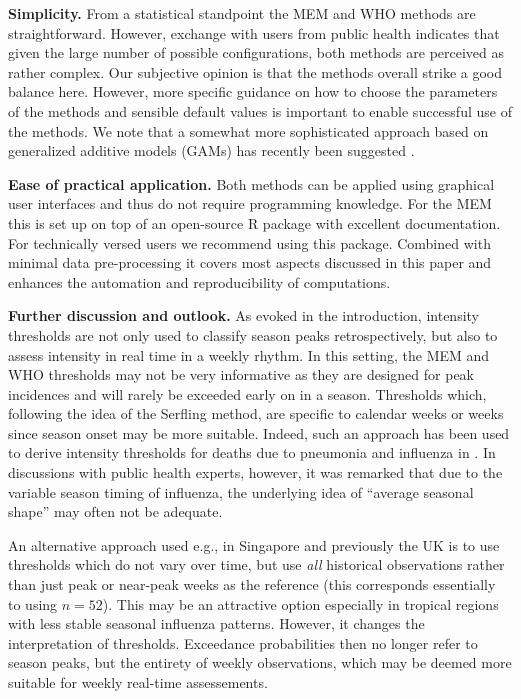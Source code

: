 \documentclass[12pt]{article}
\begin{document}
\begin{description}
\item \textbf{Simplicity.} From a statistical standpoint the MEM and WHO methods are straightforward. However, exchange with users from public health indicates that given the large number of possible configurations, both methods are perceived as rather complex. Our subjective opinion is that the methods overall strike a good balance here. However, more specific guidance on how to choose the parameters of the methods and sensible default values is important to enable successful use of the methods. We note that a somewhat more sophisticated approach based on generalized additive models (GAMs) has recently been suggested \citep{Pang2023}.
\item \textbf{Ease of practical application.} Both methods can be applied using graphical user interfaces and thus do not require programming knowledge. For the MEM this is set up on top of an open-source R package with excellent documentation. For technically versed users we recommend using this package. Combined with minimal data pre-processing it covers most aspects discussed in this paper and enhances the automation and reproducibility of computations.
\end{description}

\noindent \textbf{Further discussion and outlook.} As evoked in the introduction, intensity thresholds are not only used to classify season peaks retrospectively, but also to assess intensity in real time in a weekly rhythm. In this setting, the MEM and WHO thresholds may not be very informative as they are designed for peak incidences and will rarely be exceeded early on in a season. Thresholds which, following the idea of the Serfling method, are specific to calendar weeks or weeks since season onset may be more suitable. Indeed, such an approach has been used to derive intensity thresholds for deaths due to pneumonia and influenza in \cite{Biggerstaff2017}. In discussions with public health experts, however, it was remarked that due to the variable season timing of influenza, the underlying idea of ``average seasonal shape'' may often not be adequate.

An alternative approach used e.g., in Singapore \citep{Pung2020} and previously the UK \citep{Green2015} is to use thresholds which do not vary over time, but use \textit{all} historical observations rather than just peak or near-peak weeks as the reference (this corresponds essentially to using $n = 52$). This may be an attractive option especially in tropical regions with less stable seasonal influenza patterns. However, it changes the interpretation of thresholds. Exceedance probabilities then no longer refer to season peaks, but the entirety of weekly observations, which may be deemed more suitable for weekly real-time assessements.
\end{document}

